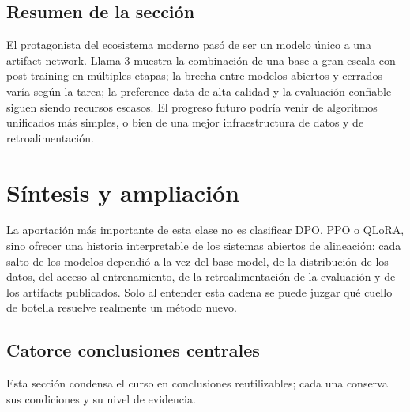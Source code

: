 \documentclass[a4paper]{article}
\begin{document}

\subsection{Resumen de la sección}

El protagonista del ecosistema moderno pasó de ser un modelo único a una artifact network. Llama 3 muestra la combinación de una base a gran escala con post-training en múltiples etapas; la brecha entre modelos abiertos y cerrados varía según la tarea; la preference data de alta calidad y la evaluación confiable siguen siendo recursos escasos. El progreso futuro podría venir de algoritmos unificados más simples, o bien de una mejor infraestructura de datos y de retroalimentación.
\section{Síntesis y ampliación}

La aportación más importante de esta clase no es clasificar DPO, PPO o QLoRA, sino ofrecer una historia interpretable de los sistemas abiertos de alineación: cada salto de los modelos dependió a la vez del base model, de la distribución de los datos, del acceso al entrenamiento, de la retroalimentación de la evaluación y de los artifacts publicados. Solo al entender esta cadena se puede juzgar qué cuello de botella resuelve realmente un método nuevo.

\subsection{Catorce conclusiones centrales}

Esta sección condensa el curso en conclusiones reutilizables; cada una conserva sus condiciones y su nivel de evidencia.
\end{document}
